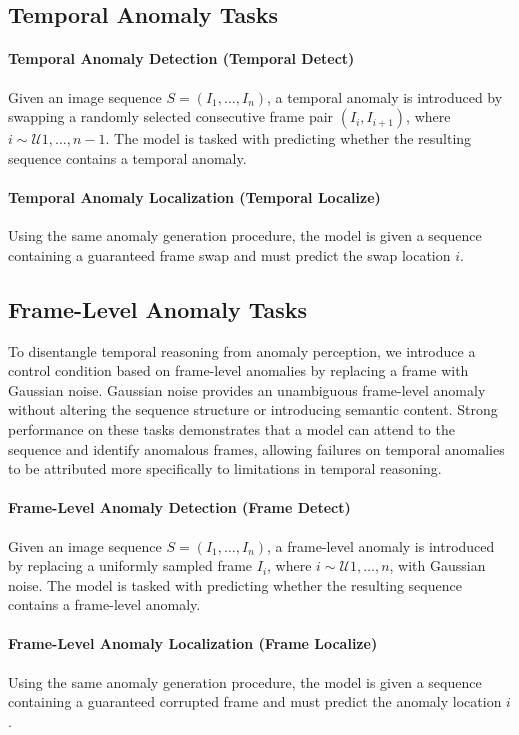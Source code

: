 \documentclass[11pt]{article}
\begin{document}
\subsection{Temporal Anomaly Tasks}

\paragraph{Temporal Anomaly Detection (Temporal Detect)}
Given an image sequence $S=(I_1,\ldots,I_n)$, a temporal anomaly is introduced by swapping a randomly selected consecutive frame pair $(I_i, I_{i+1})$, where $i \sim \mathcal{U}{1,\ldots,n-1}$. The model is tasked with predicting whether the resulting sequence contains a temporal anomaly.

\paragraph{Temporal Anomaly Localization (Temporal Localize)}
Using the same anomaly generation procedure, the model is given a sequence containing a guaranteed frame swap and must predict the swap location $i$.



\subsection{Frame-Level Anomaly Tasks}

To disentangle temporal reasoning from anomaly perception, we introduce a control condition based on frame-level anomalies by replacing a frame with Gaussian noise. Gaussian noise provides an unambiguous frame-level anomaly without altering the sequence structure or introducing semantic content. Strong performance on these tasks demonstrates that a model can attend to the sequence and identify anomalous frames, allowing failures on temporal anomalies to be attributed more specifically to limitations in temporal reasoning.

\paragraph{Frame-Level Anomaly Detection (Frame Detect)}
Given an image sequence $S=(I_1,\ldots,I_n)$, a frame-level anomaly is introduced by replacing a uniformly sampled frame $I_i$, where $i \sim \mathcal{U}{1,\ldots,n}$, with Gaussian noise. The model is tasked with predicting whether the resulting sequence contains a frame-level anomaly.

\paragraph{Frame-Level Anomaly Localization (Frame Localize)}
Using the same anomaly generation procedure, the model is given a sequence containing a guaranteed corrupted frame and must predict the anomaly location $i$.
\end{document}
